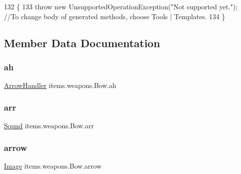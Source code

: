 \begin{DoxyCode}
132                            \{
133         \textcolor{keywordflow}{throw} \textcolor{keyword}{new} UnsupportedOperationException(\textcolor{stringliteral}{"Not supported yet."}); \textcolor{comment}{//To change body of generated
       methods, choose Tools | Templates.}
134     \}
\end{DoxyCode}


\subsection{Member Data Documentation}
\mbox{\label{classitems_1_1weapons_1_1_bow_a04ecddeefa27f007f2e29a8fc8298e23}} 
\subsubsection{\texorpdfstring{ah}{ah}}
{\footnotesize\ttfamily \mbox{\hyperlink{classitems_1_1weapons_1_1_arrow_handler}{Arrow\+Handler}} items.\+weapons.\+Bow.\+ah\hspace{0.3cm}{\ttfamily [private]}}

\mbox{\label{classitems_1_1weapons_1_1_bow_a5b267dc01cddeb22261f8d5dde8bedc9}} 
\subsubsection{\texorpdfstring{arr}{arr}}
{\footnotesize\ttfamily \mbox{\hyperlink{classorg_1_1newdawn_1_1slick_1_1_sound}{Sound}} items.\+weapons.\+Bow.\+arr\hspace{0.3cm}{\ttfamily [private]}}

\mbox{\label{classitems_1_1weapons_1_1_bow_a6bb996a10bf375e8a93d452fb7ee70a9}} 
\subsubsection{\texorpdfstring{arrow}{arrow}}
{\footnotesize\ttfamily \mbox{\hyperlink{classorg_1_1newdawn_1_1slick_1_1_image}{Image}} items.\+weapons.\+Bow.\+arrow\hspace{0.3cm}{\ttfamily [private]}}

